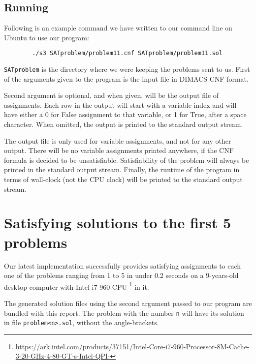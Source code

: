 \documentclass{article}
\begin{document}
\subsection{Running}

Following is an example command we have written to our command
line on Ubuntu to use our program:

\begin{center}
    \begin{verbatim}
        ./s3 SATproblem/problem11.cnf SATproblem/problem11.sol
    \end{verbatim}
\end{center}

\texttt{SATproblem} is the directory where we were keeping the
problems sent to us. First of the arguments given to the program
is the input file in DIMACS CNF format.

Second argument is optional, and when given, will be the output
file of assignments. Each row in the output will start with
a variable index and will have either a 0 for False assignment
to that variable, or 1 for True, after a space character.
When omitted, the output is printed to the standard output stream.

The output file is only used for variable assignments,
and not for any other output. There will be no variable
assignments printed anywhere, if the CNF formula is decided to
be unsatisfiable. Satisfiability of the problem will always
be printed in the standard output stream. Finally, the
runtime of the program in terms of wall-clock (not the CPU clock)
will be printed to the standard output stream.

\section{Satisfying solutions to the first 5 problems}

Our latest implementation successfully provides satisfying
assignments to each one of the problems ranging from 1 to 5
in under 0.2 seconds on a 9-years-old desktop computer
with Intel\textsuperscript{\textregistered} i7-960 CPU%
\footnote{\url{https://ark.intel.com/products/37151/Intel-Core-i7-960-Processor-8M-Cache-3-20-GHz-4-80-GT-s-Intel-QPI-}}
in it.

The generated solution files using the second argument
passed to our program are bundled with this report.
The problem with the number \texttt{n} will have its
solution in file \texttt{problem<n>.sol}, without
the angle-brackets.
\end{document}
